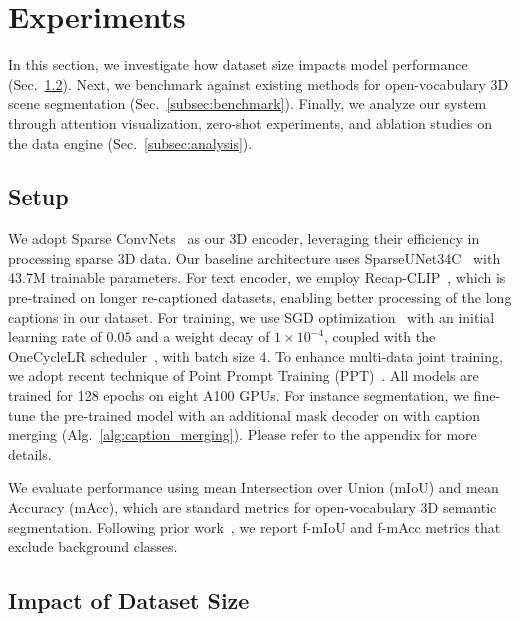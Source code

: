\section{Experiments}
\label{sec:experiments}
In this section, we investigate how dataset size impacts model performance (Sec.~\ref{subsec:scaling}).
Next, we benchmark \nickname against existing methods for open-vocabulary 3D scene segmentation (Sec.~\ref{subsec:benchmark}).
Finally, we analyze our system through attention visualization, zero-shot experiments, and ablation studies on the \dataname data engine (Sec.~\ref{subsec:analysis}).

\subsection{Setup}

We adopt Sparse ConvNets~\cite{graham20183d,mink} as our 3D encoder, leveraging their efficiency in processing sparse 3D data.%
Our baseline architecture uses SparseUNet34C~\cite{mink} with 43.7M trainable parameters. %
For text encoder, we employ Recap-CLIP~\cite{li2024if}, which is pre-trained on longer re-captioned datasets, enabling better processing of the long captions in our dataset.
For training, we use SGD optimization~\cite{bottou2010large} with an initial learning rate of $0.05$ and a weight decay of $1\times10^{-4}$, coupled with the OneCycleLR scheduler~\cite{smith2019super}, with batch size 4. 
To enhance multi-data joint training, we adopt recent technique of Point Prompt Training (PPT)~\cite{wu2023towards}.
All models are trained for 128 epochs on eight A100 GPUs.
For instance segmentation, we fine-tune the pre-trained \nickname model with an additional mask decoder on \dataname with caption merging (Alg.~\ref{alg:caption_merging}).
Please refer to the appendix for more details.

We evaluate performance using mean Intersection over Union (mIoU) and mean Accuracy (mAcc), which are standard metrics for open-vocabulary 3D semantic segmentation. 
Following prior work~\cite{jiang2024open,yang2024regionplc,ding2022pla}, we report f-mIoU and f-mAcc metrics that exclude background classes.

\subsection{Impact of Dataset Size}
\label{subsec:scaling}





